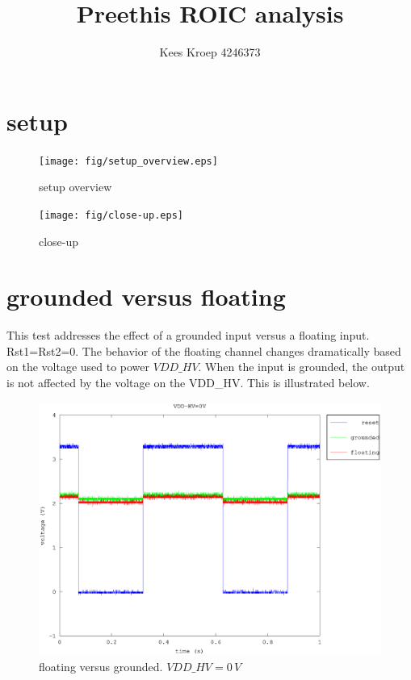 \documentclass{article}
\title{Preethis ROIC analysis}
\author{Kees Kroep 4246373}
\begin{document}
  \maketitle

\section{setup}\label{sec:setup}

\begin{figure}[h]
	\centering
	\texttt{[image: fig/setup\_overview.eps]}
	\caption{setup overview}
	\label{fig:setup_overview}
\end{figure}

\begin{figure}[h]
	\centering
	\texttt{[image: fig/close-up.eps]}
	\caption{close-up}
	\label{fig:close-up}
\end{figure}

\clearpage
\section{grounded versus floating}
This test addresses the effect of a grounded input versus a floating input. Rst1=Rst2=0.
The behavior of the floating channel changes dramatically based on the voltage used to power $VDD\_HV$. When the input is grounded, the output is not affected by the voltage on the VDD\_HV. This is illustrated below.

\begin{figure}[H]
	\centering
	\includegraphics[width=0.8\linewidth]{fig/g_f_0V.eps}
	\caption{floating versus grounded. $VDD\_HV=0\,V$}
	\label{fig:g_f_0V}
\end{figure}
\end{document}
